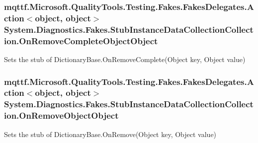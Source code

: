 \hypertarget{class_system_1_1_diagnostics_1_1_fakes_1_1_stub_instance_data_collection_collection_a1e69ba10a945b09d41d3768fcc0e7e7b}{
\subsubsection[{On\-Remove\-Complete\-Object\-Object}]{\setlength{\rightskip}{0pt plus 5cm}mqttf.\-Microsoft.\-Quality\-Tools.\-Testing.\-Fakes.\-Fakes\-Delegates.\-Action$<$object, object$>$ System.\-Diagnostics.\-Fakes.\-Stub\-Instance\-Data\-Collection\-Collection.\-On\-Remove\-Complete\-Object\-Object}}\label{class_system_1_1_diagnostics_1_1_fakes_1_1_stub_instance_data_collection_collection_a1e69ba10a945b09d41d3768fcc0e7e7b}


Sets the stub of Dictionary\-Base.\-On\-Remove\-Complete(\-Object key, Object value)

\hypertarget{class_system_1_1_diagnostics_1_1_fakes_1_1_stub_instance_data_collection_collection_a6e1b3c2c7316d84c220da15dd31fb862}{
\subsubsection[{On\-Remove\-Object\-Object}]{\setlength{\rightskip}{0pt plus 5cm}mqttf.\-Microsoft.\-Quality\-Tools.\-Testing.\-Fakes.\-Fakes\-Delegates.\-Action$<$object, object$>$ System.\-Diagnostics.\-Fakes.\-Stub\-Instance\-Data\-Collection\-Collection.\-On\-Remove\-Object\-Object}}\label{class_system_1_1_diagnostics_1_1_fakes_1_1_stub_instance_data_collection_collection_a6e1b3c2c7316d84c220da15dd31fb862}


Sets the stub of Dictionary\-Base.\-On\-Remove(\-Object key, Object value)


